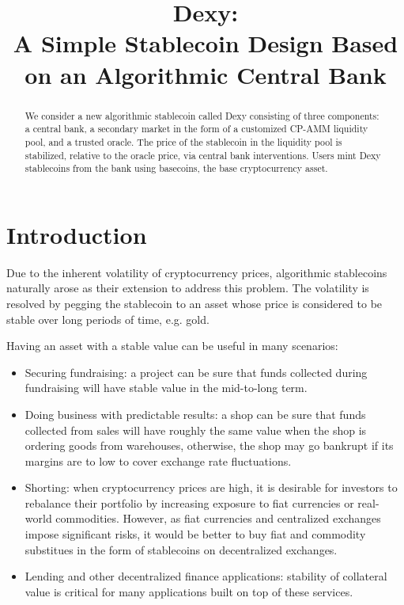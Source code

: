 \documentclass{ifcolog}
\title{Dexy:\protect \\ A Simple Stablecoin Design Based on an Algorithmic Central Bank}
\begin{document}
\maketitle

\begin{abstract}
We consider a new algorithmic stablecoin called Dexy consisting of three components: 
a central bank, a secondary market in the form of a customized CP-AMM liquidity pool, and a trusted oracle. 
The price of the stablecoin in the liquidity pool is stabilized, relative to the oracle price, via central bank interventions. 
Users mint Dexy stablecoins from the bank using basecoins, the base cryptocurrency asset.
\end{abstract}

\section{Introduction}
\label{sec:introduction}
Due to the inherent volatility of cryptocurrency prices, algorithmic stablecoins naturally arose as their extension 
to address this problem. The volatility is resolved by pegging the stablecoin to an asset whose price is 
considered to be stable over long periods of time, e.g. gold. 

Having an asset with a stable value can be useful in many scenarios:
\begin{itemize}
\item Securing fundraising: a project can be sure that funds collected during fundraising will have stable value in the mid-to-long term.
\item Doing business with predictable results: a shop can be sure that funds collected from sales will have roughly the same value when the shop is ordering goods from warehouses, otherwise, the shop may go bankrupt if its margins are to low to cover exchange rate fluctuations. 
\item Shorting: when cryptocurrency prices are high, it is desirable for investors to rebalance their portfolio by increasing exposure to fiat currencies or real-world commodities. However, as fiat currencies and centralized exchanges impose significant risks, it would be better to buy fiat and commodity substitues in the form of stablecoins on decentralized exchanges.
\item Lending and other decentralized finance applications: stability of collateral value is critical for many applications built on top of these services.
\end{itemize}
\end{document}
